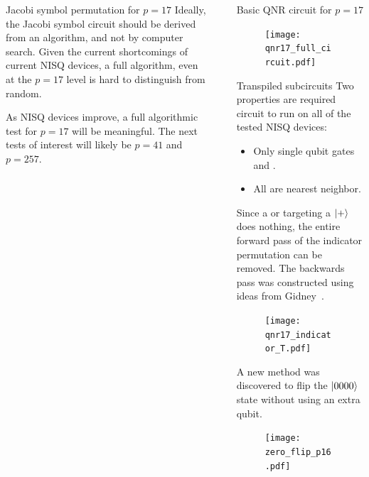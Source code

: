 \documentclass[final]{beamer}
\newlength{\sepwidth}
\newlength{\colwidth}
\newcommand{\separatorcolumn}{\begin{column}{\sepwidth}\end{column}}
\begin{document}
\begin{frame}[t]
\begin{columns}[t]
\begin{column}{\colwidth}
\begin{block}{Jacobi symbol permutation for $p=17$}
    Ideally, the Jacobi symbol circuit should be derived from an algorithm, and not by computer search.
    Given the current shortcomings of current NISQ devices, a full algorithm, even at the $p=17$ level is hard to distinguish from random. 

    As NISQ devices improve, a full algorithmic test for $p=17$ will be meaningful.
    The next tests of interest will likely be $p=41$ and $p=257$.

  \end{block}


\end{column}

\separatorcolumn

\begin{column}{\colwidth}

  \begin{block}{Basic QNR circuit  for $p=17$}

      \centering
    \begin{figure}
      \texttt{[image: qnr17\_full\_circuit.pdf]}
    \end{figure}

  \end{block}

  \begin{block}{Transpiled subcircuits}
    Two properties are required circuit to run on all of the tested NISQ devices:
    \begin{itemize}
      \item Only single qubit gates and \CNOTs.
      \item All \CNOTs are nearest neighbor.
    \end{itemize}

    Since a \CNOT or \CCNOT targeting a $\left| + \right\rangle$ does nothing, the entire forward pass of the indicator permutation can be removed.
    The backwards pass was constructed using ideas from Gidney~\cite{3957}. 
    \begin{figure}
      \texttt{[image: qnr17\_indicator\_T.pdf]}
    \end{figure}

    A new method was discovered to flip the $\left| 0000 \right\rangle$ state without using an extra qubit.%

    \begin{figure}
      \texttt{[image: zero\_flip\_p16.pdf]}
    \end{figure}


\end{block}
\end{column}
\end{columns}
\end{frame}
\end{document}
